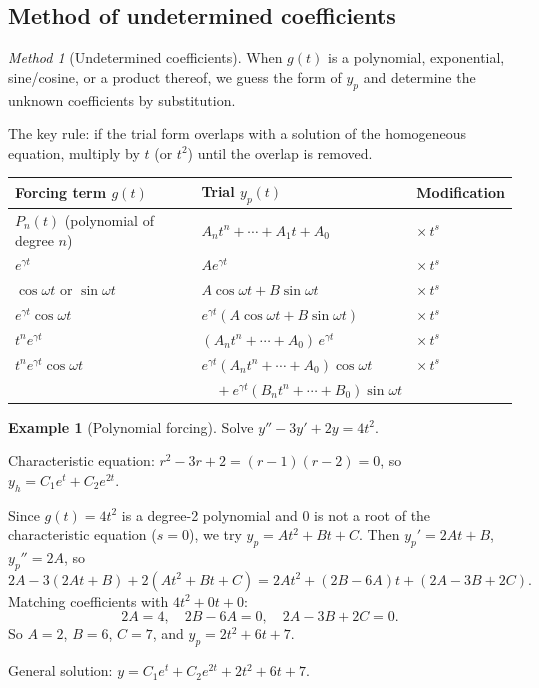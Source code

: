 \documentclass[12pt,a4paper,openany]{book}
\theoremstyle{definition}
\newtheorem{example}[definition]{Example}
\theoremstyle{plain}
\theoremstyle{remark}
\newtheorem{method}[definition]{Method}
\begin{document}
\subsection{Method of undetermined coefficients}\label{subsec:method-undetermined}

\begin{method}[Undetermined coefficients]\label{meth:undetermined}
When $g(t)$ is a polynomial, exponential, sine/cosine, or a product thereof,
we guess the form of $y_p$ and determine the unknown coefficients by
substitution.

The key rule: if the trial form overlaps with a solution of the homogeneous
equation, multiply by $t$ (or $t^2$) until the overlap is removed.
\end{method}

\begin{center}
\renewcommand{\arraystretch}{1.4}
\begin{tabular}{lll}
\toprule
\textbf{Forcing term $g(t)$} & \textbf{Trial $y_p(t)$} & \textbf{Modification} \\
\midrule
$P_n(t)$ (polynomial of degree $n$) & $A_n t^n + \dotsb + A_1 t + A_0$ & $\times\, t^s$ \\
$e^{\gamma t}$ & $A e^{\gamma t}$ & $\times\, t^s$ \\
$\cos\omega t$ or $\sin\omega t$ & $A\cos\omega t + B\sin\omega t$ & $\times\, t^s$ \\
$e^{\gamma t}\cos\omega t$ & $e^{\gamma t}(A\cos\omega t + B\sin\omega t)$ & $\times\, t^s$ \\
$t^n e^{\gamma t}$ & $(A_n t^n + \dotsb + A_0)\,e^{\gamma t}$ & $\times\, t^s$ \\
$t^n e^{\gamma t}\cos\omega t$ &
  $e^{\gamma t}(A_n t^n+\dotsb+A_0)\cos\omega t$ & $\times\, t^s$ \\
& $\quad{}+ e^{\gamma t}(B_n t^n+\dotsb+B_0)\sin\omega t$ & \\
\bottomrule
\end{tabular}
\label{tab:undetermined}
\end{center}

\begin{example}[Polynomial forcing]\label{ex:poly-forcing}
Solve $y'' - 3y' + 2y = 4t^2$.

Characteristic equation: $r^2 - 3r + 2 = (r-1)(r-2) = 0$, so
$y_h = C_1 e^t + C_2 e^{2t}$.

Since $g(t) = 4t^2$ is a degree-2 polynomial and $0$ is not a root of the
characteristic equation ($s=0$), we try $y_p = At^2 + Bt + C$.
Then $y_p' = 2At + B$, $y_p'' = 2A$, so
\[
  2A - 3(2At+B) + 2(At^2+Bt+C) = 2At^2 + (2B-6A)t + (2A-3B+2C).
\]
Matching coefficients with $4t^2 + 0t + 0$:
\[
  2A = 4, \quad 2B - 6A = 0, \quad 2A - 3B + 2C = 0.
\]
So $A = 2$, $B = 6$, $C = 7$, and $y_p = 2t^2 + 6t + 7$.

General solution: $y = C_1 e^t + C_2 e^{2t} + 2t^2 + 6t + 7$.
\end{example}
\end{document}
